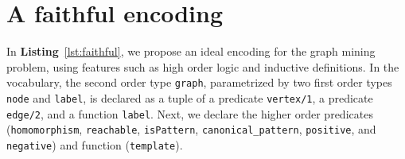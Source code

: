 \section{A faithful encoding}\label{sec:extension}


\vspace{-0.5em}
In \textbf{Listing}~\ref{lst:faithful}, we propose an ideal encoding for the graph mining problem, using features such as high order logic and inductive definitions.
In the vocabulary, the second order type \lstinline{graph}, parametrized by two first order types \lstinline{node} and {\lstset{breakatwhitespace} \lstinline{label},} is declared as a tuple of a predicate \lstinline{vertex/1}, a predicate \lstinline{edge/2}, and a function \lstinline|label|.
Next, we declare the higher order predicates (\lstinline|homomorphism|, \lstinline|reachable|, \lstinline|isPattern|, \lstinline|canonical_pattern|, \lstinline|positive|, and \lstinline|negative|) and function (\lstinline|template|).

